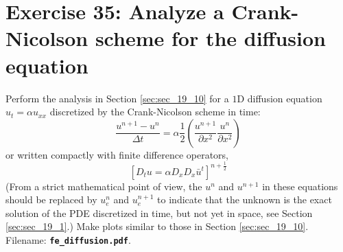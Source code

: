 \documentclass[../main.tex]{subfiles}
\begin{document}
	\section*{Exercise 35: Analyze a Crank-Nicolson scheme for the diffusion equation}		
		\noindent Perform the analysis in Section \ref{sec:sec_19_10} for a $1 \mathrm{D}$ diffusion equation $u_{t}=\alpha u_{x x}$ discretized by the Crank-Nicolson scheme in time:
		$$
		\frac{u^{n+1}-u^{n}}{\Delta t}=\alpha \frac{1}{2}\left(\frac{u^{n+1}}{\partial x^{2}} \frac{u^{n}}{\partial x^{2}}\right)
		$$
		or written compactly with finite difference operators,
		$$
		\left[D_{t} u=\alpha D_{x} D_{x} \bar{u}^{t}\right]^{n+\frac{1}{2}}
		$$
		(From a strict mathematical point of view, the $u^{n}$ and $u^{n+1}$ in these equations should be replaced by $u_{e}^{n}$ and $u_{e}^{n+1}$ to indicate that the unknown is the exact solution of the PDE discretized in time, but not yet in space, see Section \ref{sec:sec_19_1}.) Make plots similar to those in Section \ref{sec:sec_19_10}. 
		Filename: \textbf{\texttt{fe\_diffusion.pdf}}.\bigbreak


\clearpage
\end{document}

